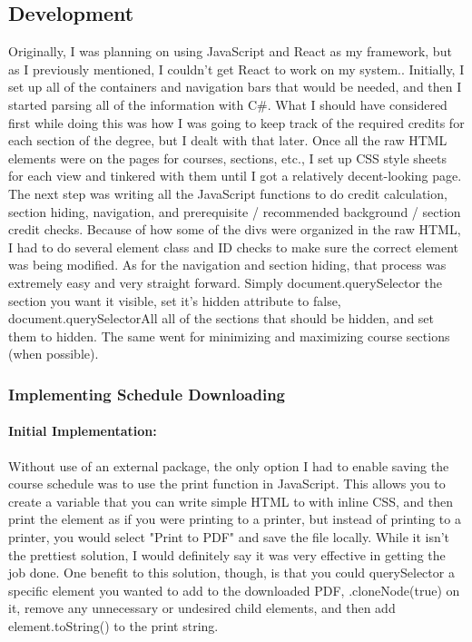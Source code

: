 \documentclass[12pt]{article}
\begin{document}
		\subsection{Development}
			Originally, I was planning on using JavaScript and React as my framework, but as I previously mentioned, I couldn't get React to work on my system.. Initially, I set up all of the containers and navigation bars that would be needed, and then I started parsing all of the information with C\#. What I should have considered first while doing this was how I was going to keep track of the required credits for each section of the degree, but I dealt with that later. Once all the raw HTML elements were on the pages for courses, sections, etc., I set up CSS style sheets for each view and tinkered with them until I got a relatively decent-looking page. The next step was writing all the JavaScript functions to do credit calculation, section hiding, navigation, and prerequisite / recommended background / section credit checks. Because of how some of the divs were organized in the raw HTML, I had to do several element class and ID checks to make sure the correct element was being modified. As for the navigation and section hiding, that process was extremely easy and very straight forward. Simply document.querySelector the section you want it visible, set it's hidden attribute to false, document.querySelectorAll all of the sections that should be hidden, and set them to hidden. The same went for minimizing and maximizing course sections (when possible).
			
			\subsubsection{Implementing Schedule Downloading}
				\paragraph{Initial Implementation:}
					Without use of an external package, the only option I had to enable saving the course schedule was to use the print function in JavaScript. This allows you to create a variable that you can write simple HTML to with inline CSS, and then print the element as if you were printing to a printer, but instead of printing to a printer, you would select "Print to PDF" and save the file locally. While it isn't the prettiest solution, I would definitely say it was very effective in getting the job done. One benefit to this solution, though, is that you could querySelector a specific element you wanted to add to the downloaded PDF, .cloneNode(true) on it, remove any unnecessary or undesired child elements, and then add element.toString() to the print string.
				
\end{document}
